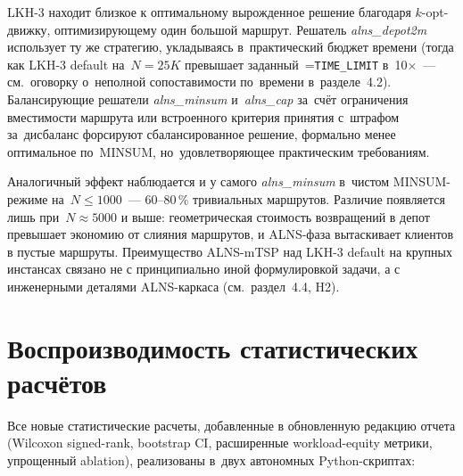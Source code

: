 \documentclass[a4paper,14pt]{extreport}
\makeatletter
\let\old@texttt\texttt
\renewcommand{\texttt}[1]{{\sloppy\hyphenchar\font=\m@ne\old@texttt{#1}}}
\makeatother
\begin{document}
LKH-3 находит близкое к оптимальному вырожденное решение благодаря $k$-opt-движку, оптимизирующему один большой маршрут. Решатель \emph{alns\_depot2m} использует ту же стратегию, укладываясь в~практический бюджет времени (тогда как LKH-3 default на~$N=25K$ превышает заданный~\texttt{TIME\_LIMIT} в~10$\times$~--- см.~оговорку о~неполной сопоставимости по~времени в~разделе~4.2). Балансирующие решатели \emph{alns\_minsum} и~\emph{alns\_cap} за~счёт ограничения вместимости маршрута или встроенного критерия принятия с~штрафом за~дисбаланс форсируют сбалансированное решение, формально менее оптимальное по~MINSUM, но~удовлетворяющее практическим требованиям.

Аналогичный эффект наблюдается и у самого \emph{alns\_minsum} в~чистом MINSUM-режиме на~$N\leq 1000$~--- 60--80\,\% тривиальных маршрутов. Различие появляется лишь при~$N\approx 5000$ и выше: геометрическая стоимость возвращений в депот превышает экономию от слияния маршрутов, и ALNS-фаза вытаскивает клиентов в пустые маршруты. Преимущество ALNS-mTSP над LKH-3 default на крупных инстансах связано не с принципиально иной формулировкой задачи, а с инженерными деталями ALNS-каркаса (см.~раздел~4.4, H2).

\chapter{Воспроизводимость статистических расчётов}

Все новые статистические расчеты, добавленные в обновленную редакцию отчета (Wilcoxon signed-rank, bootstrap CI, расширенные workload-equity метрики, упрощенный ablation), реализованы в~двух автономных Python-скриптах:
\end{document}
